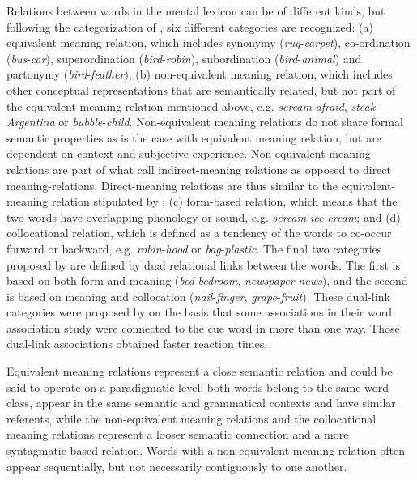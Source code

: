 \documentclass[output=paper,colorlinks,citecolor=brown,nonflat]{langsci/langscibook}
\begin{document}
Relations between words in the mental lexicon can be of different kinds, but following the categorization of \citet{FitzpatrickIzura2011}, six different categories are recognized: (a) equivalent meaning relation, which includes synonymy (\textit{rug}{}-\textit{carpet}), co-ordination (\textit{bus}{}-\textit{car}), superordination (\textit{bird}{}-\textit{robin}), subordination (\textit{bird}{}-\textit{animal}) and partonymy (\textit{bird}{}-\textit{feather}); (b) non-equivalent meaning relation, which includes other conceptual representations that are semantically related, but not part of the equivalent meaning relation mentioned above, e.g. \textit{scream}{}-\textit{afraid}, \textit{steak}{}-\textit{Argentina} or \textit{bubble}{}-\textit{child}. Non-equivalent meaning relations do not share formal semantic properties as is the case with equivalent meaning relation, but are dependent on context and subjective experience. Non-equivalent meaning relations are part of what \citet[194]{CremerEtAl2010} call indirect-meaning relations as opposed to direct meaning-relations. Direct-meaning relations are thus similar to the equivalent-meaning relation stipulated by \citet{FitzpatrickIzura2011}; (c) form-based relation, which means that the two words have overlapping phonology or sound, e.g. \textit{scream}{}-\textit{ice cream}; and (d) collocational relation, which is defined as a tendency of the words to co-occur forward or backward, e.g. \textit{robin}{}-\textit{hood} or \textit{bag}{}-\textit{plastic}. The final two categories proposed by \citet{FitzpatrickIzura2011} are defined by dual relational links between the words. The first is based on both form and meaning (\textit{bed}{}-\textit{bedroom}, \textit{newspaper}{}-\textit{news}), and the second is based on meaning and collocation (\textit{nail}{}-\textit{finger}, \textit{grape}{}-\textit{fruit}). These dual-link categories were proposed by \citet{FitzpatrickIzura2011} on the basis that some associations in their word association study were connected to the cue word in more than one way. Those dual-link associations obtained faster reaction times.

Equivalent meaning relations represent a close semantic relation and could be said to operate on a paradigmatic level: both words belong to the same word class, appear in the same semantic and grammatical contexts and have similar referents, while the non-equivalent meaning relations and the collocational meaning relations represent a looser semantic connection and a more syntagmatic-based relation. Words with a non-equivalent meaning relation often appear sequentially, but not necessarily contiguously to one another.
\end{document}
